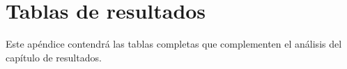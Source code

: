 \chapter{Tablas de resultados}

Este apéndice contendrá las tablas completas que complementen el análisis del capítulo de resultados.
